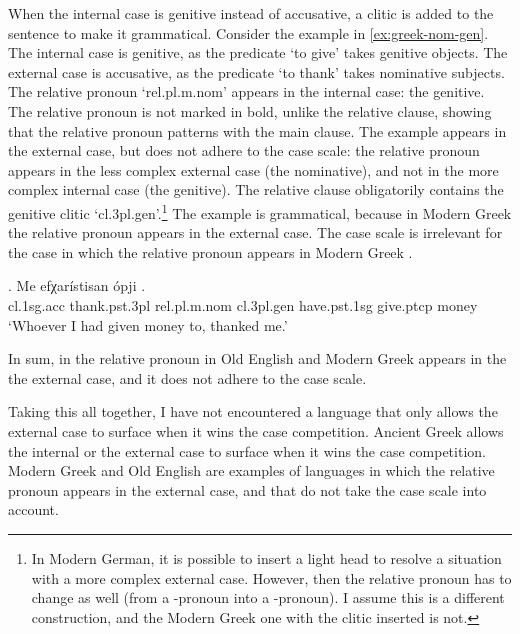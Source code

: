 When the internal case is genitive instead of accusative, a clitic is added to the sentence to make it grammatical.
Consider the example in \ref{ex:greek-nom-gen}.
The internal case is genitive, as the predicate  `to give' takes genitive objects.
The external case is accusative, as the predicate  `to thank' takes nominative subjects.
The relative pronoun  `\ac{rel}.\ac{pl}.\ac{m}.\ac{nom}' appears in the internal case: the genitive. The relative pronoun is not marked in bold, unlike the relative clause, showing that the relative pronoun patterns with the main clause.
The example appears in the external case, but does not adhere to the case scale: the relative pronoun appears in the less complex external case (the nominative), and not in the more complex internal case (the genitive). The relative clause obligatorily contains the genitive clitic  `\ac{cl}.3\ac{pl}.\ac{gen}'.\footnote{
In Modern German, it is possible to insert a light head to resolve a situation with a more complex external case. However, then the relative pronoun has to change as well (from a -pronoun into a -pronoun). I assume this is a different construction, and the Modern Greek one with the clitic inserted is not.
}
The example is grammatical, because in Modern Greek the relative pronoun appears in the external case. The case scale is irrelevant for the case in which the relative pronoun appears in Modern Greek .

\exg. Me efχarístisan ópji    .\\
 \ac{cl}.1\ac{sg}.\ac{acc} thank.\ac{pst}.3\ac{pl} \ac{rel}.\ac{pl}.\ac{m}.\ac{nom} \ac{cl}.3\ac{pl}.\ac{gen} have.\ac{pst}.1\ac{sg} give.\ac{ptcp} money\\
 `Whoever I had given money to, thanked me.'\label{ex:greek-nom-gen}

In sum, in the relative pronoun in Old English and Modern Greek appears in the the external case, and it does not adhere to the case scale.

Taking this all together, I have not encountered a language that only allows the external case to surface when it wins the case competition. Ancient Greek allows the internal or the external case to surface when it wins the case competition. Modern Greek and Old English are examples of languages in which the relative pronoun appears in the external case, and that do not take the case scale into account.


